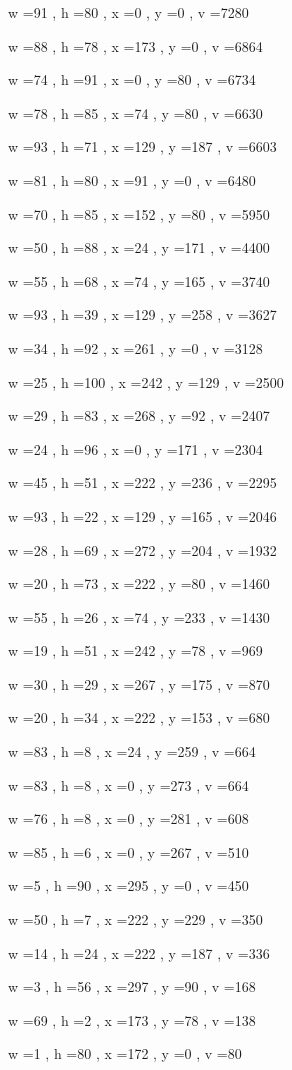 \documentclass[11pt]{article}
\begin{document}
w =91 , h =80 , x =0 , y =0 , v =7280
\par
w =88 , h =78 , x =173 , y =0 , v =6864
\par
w =74 , h =91 , x =0 , y =80 , v =6734
\par
w =78 , h =85 , x =74 , y =80 , v =6630
\par
w =93 , h =71 , x =129 , y =187 , v =6603
\par
w =81 , h =80 , x =91 , y =0 , v =6480
\par
w =70 , h =85 , x =152 , y =80 , v =5950
\par
w =50 , h =88 , x =24 , y =171 , v =4400
\par
w =55 , h =68 , x =74 , y =165 , v =3740
\par
w =93 , h =39 , x =129 , y =258 , v =3627
\par
w =34 , h =92 , x =261 , y =0 , v =3128
\par
w =25 , h =100 , x =242 , y =129 , v =2500
\par
w =29 , h =83 , x =268 , y =92 , v =2407
\par
w =24 , h =96 , x =0 , y =171 , v =2304
\par
w =45 , h =51 , x =222 , y =236 , v =2295
\par
w =93 , h =22 , x =129 , y =165 , v =2046
\par
w =28 , h =69 , x =272 , y =204 , v =1932
\par
w =20 , h =73 , x =222 , y =80 , v =1460
\par
w =55 , h =26 , x =74 , y =233 , v =1430
\par
w =19 , h =51 , x =242 , y =78 , v =969
\par
w =30 , h =29 , x =267 , y =175 , v =870
\par
w =20 , h =34 , x =222 , y =153 , v =680
\par
w =83 , h =8 , x =24 , y =259 , v =664
\par
w =83 , h =8 , x =0 , y =273 , v =664
\par
w =76 , h =8 , x =0 , y =281 , v =608
\par
w =85 , h =6 , x =0 , y =267 , v =510
\par
w =5 , h =90 , x =295 , y =0 , v =450
\par
w =50 , h =7 , x =222 , y =229 , v =350
\par
w =14 , h =24 , x =222 , y =187 , v =336
\par
w =3 , h =56 , x =297 , y =90 , v =168
\par
w =69 , h =2 , x =173 , y =78 , v =138
\par
w =1 , h =80 , x =172 , y =0 , v =80
\par
\newpage
\end{document}
